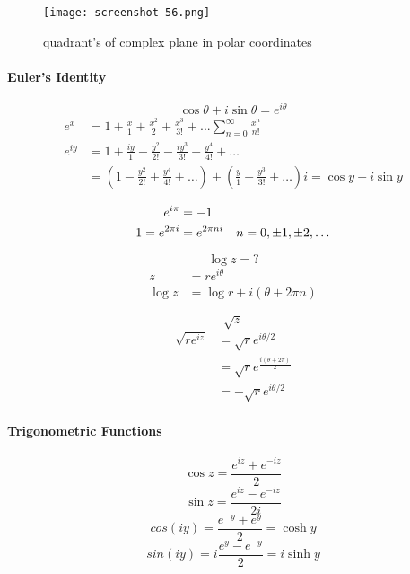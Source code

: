 \documentclass[svgnames]{article}   	%
\begin{document}
\begin{figure}[H]
  \centering
    \texttt{[image: screenshot 56.png]}
    \caption{quadrant's of complex plane in polar coordinates}
\end{figure}




\paragraph{Euler's Identity}

\[
  \cos \theta + i \sin \theta = e^{i\theta}
\]
\begin{align*}
  e^{x} &= 1 + \frac{x}{1} + \frac{x^2}{2} + \frac{x^3}{3!} + ...
  \sum_{n=0}^{\infty} \frac{x^n}{n!} \\
  e^{iy} &= 1 + \frac{iy}{1} - \frac{y^2}{2!} - \frac{iy^3}{3!} + \frac{y^4}{4!}
  + \dots \\
         &= \left(1 - \frac{y^2}{2!} + \frac{y^4}{4!} + \dots \right) + \left(\frac{y}{1}
- \frac{y^3}{3!} + \dots \right)i = \cos y + i \sin y 
\end{align*}

\begin{tcolorbox}[title = Euler's Identities]
  \begin{align*}
    e^{i\pi} &= -1 \\
    1 = e^{2\pi i} &= e^{2\pi n i} \hspace{10px} n = 0, \pm 1, \pm 2, \dots
\end{align*}

\end{tcolorbox}

\[
\log z = ?
\]
\begin{align*}
  z &= re^{i\theta} \\
  \log z &= \log r + i(\theta + 2 \pi n)
\end{align*}

\[
\sqrt{z}
\]
\begin{align*}
  \sqrt{re^{iz}} &= \sqrt{r} e^{i\theta / 2} \\
                 &= \sqrt{r}e^{\frac{i(\theta + 2\pi)}{2}}\\
                 &= -\sqrt{r} e^{i\theta / 2}
\end{align*}

\paragraph{Trigonometric Functions}

\[
  \cos z = \frac{e^{iz} + e^{-iz}}{2}
\]
\[
  \sin z = \frac{e^{iz} - e^{-iz}}{2i}
\]
\[
  cos(iy) = \frac{e^{-y} + e^{y}}{2} = \cosh y
\]
\[
  sin(iy) = i\frac{e^y - e^{-y}}{2} = i\sinh y
\]
\end{document}
